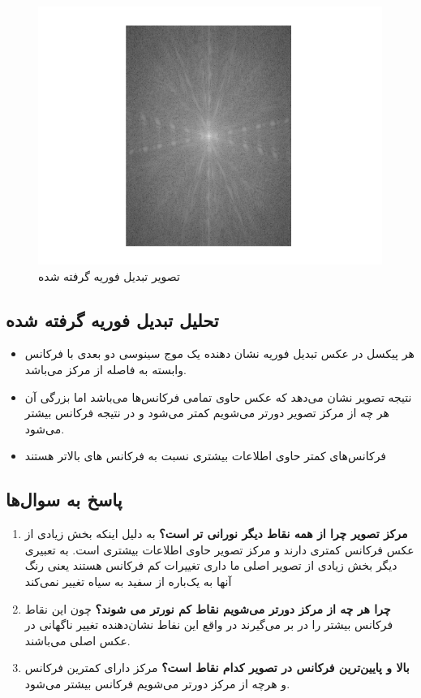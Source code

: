 \begin{figure}[H]
    \centering
    \includegraphics[width=0.65\linewidth]{images/fourier.png}
    \caption{ تصویر تبدیل فوریه گرفته شده }
    \label{fig:h}
\end{figure}

\subsection{تحلیل تبدیل فوریه گرفته شده}

\begin{itemize}
    \item هر پیکسل در عکس تبدیل فوریه نشان دهنده 
    یک موج سینوسی دو بعدی با فرکانس وابسته به فاصله از مرکز می‌باشد.
    \item نتیجه تصویر نشان می‌دهد که عکس حاوی تمامی فرکانس‌ها می‌باشد اما بزرگی آن هر چه از مرکز تصویر دورتر می‌شویم کمتر می‌شود و در نتیجه فرکانس بیشتر می‌شود.
    \item 
    فرکانس‌های کمتر حاوی اطلاعات بیشتری نسبت به فرکانس های بالاتر هستند
\end{itemize}
\subsection{پاسخ به سوال‌ها}
\begin{enumerate}
    \item \textbf{مرکز تصویر چرا از همه نقاط دیگر نورانی تر است؟}
    به دلیل اینکه بخش زیادی از عکس فرکانس کمتری دارند و مرکز تصویر حاوی اطلاعات بیشتری است.
    به تعبیری دیگر بخش زیادی از تصویر اصلی ما داری تغییرات کم فرکانس هستند یعنی رنگ آنها به یک‌باره از سفید به سیاه تغییر نمی‌کند
    \item \textbf{چرا هر چه از مرکز دورتر می‌شویم نقاط کم نورتر می شوند؟}
    چون این نقاط فرکانس بیشتر را در بر می‌گیرند در واقع این نفاط نشان‌دهنده تغییر ناگهانی در عکس اصلی می‌باشند.
    \item \textbf{بالا و پایین‌ترین فرکانس در تصویر کدام نقاط است؟}
    مرکز دارای کمترین فرکانس و هرچه از مرکز دورتر می‌شویم فرکانس بیشتر می‌شود.
\end{enumerate}
